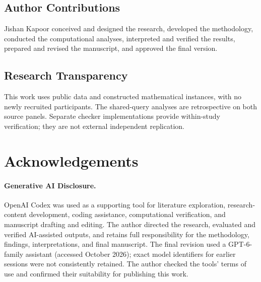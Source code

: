 \subsection*{Author Contributions}
Jishan Kapoor conceived and designed the research, developed the methodology,
conducted the computational analyses, interpreted and verified the results,
prepared and revised the manuscript, and approved the final version.

\subsection*{Research Transparency}
This work uses public data and constructed mathematical instances, with
no newly recruited participants. The shared-query analyses are retrospective
on both source panels. Separate checker implementations provide within-study
verification; they are not external independent replication.

\section*{Acknowledgements}
\paragraph{Generative AI Disclosure.}
OpenAI Codex was used as a supporting tool for literature exploration,
research-content development, coding assistance, computational verification,
and manuscript drafting and editing.
The author directed the research, evaluated and verified AI-assisted outputs,
and retains full responsibility for the methodology, findings, interpretations,
and final manuscript. The final revision used a GPT-6-family assistant
(accessed October 2026); exact model identifiers for earlier sessions were
not consistently retained. The author checked the tools' terms of use and
confirmed their suitability for publishing this work.
